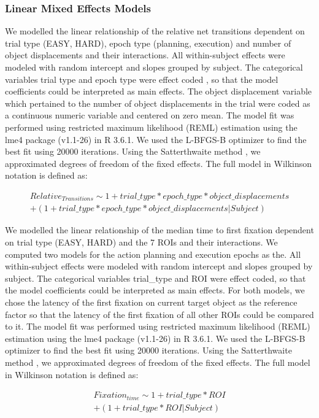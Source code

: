 \subsubsection{Linear Mixed Effects Models} \label{sec:lmm}
We modelled the linear relationship of the relative net transitions dependent on trial type (EASY, HARD), epoch type (planning, execution) and number of object displacements and their interactions. All within-subject effects were modeled with random intercept and slopes grouped by subject. The categorical variables trial type and epoch type were effect coded \citep{Schad2018-av}, so that the model coefficients could be interpreted as main effects. The object displacement variable which pertained to the number of object displacements in the trial were coded as a continuous numeric variable and centered on zero mean. The model fit was performed using restricted maximum likelihood (REML) estimation \citep{Corbeil1976-qq} using the lme4 package (v1.1-26) in R 3.6.1. We used the L-BFGS-B optimizer to find the best fit using 20000 iterations. Using the Satterthwaite method \citep{Luke2017-pz}, we approximated degrees of freedom of the fixed effects. The full model in Wilkinson notation \citep{Wilkinson1973-ex}  is defined as:

\begin{gather}\label{eq:lmm_formula1}
     Relative_{Transitions} \sim 1 + trial\_type * epoch\_type * object\_displacements \\
     + (1 + trial\_type * epoch\_type * object\_displacements | Subject ) 
\end{gather} 


We modelled the linear relationship of the median time to first fixation dependent on trial type (EASY, HARD) and the 7 ROIs and their interactions. We computed two models for the action planning and execution epochs as the. All within-subject effects were modeled with random intercept and slopes grouped by subject. The categorical variables trial\_type and ROI were effect coded, so that the model coefficients could be interpreted as main effects. For both models, we chose the latency of the first fixation on current target object as the reference factor so that the latency of the first fixation of all other ROIs could be compared to it. The model fit was performed using restricted maximum likelihood (REML) estimation \citep{Corbeil1976-qq} using the lme4 package (v1.1-26) in R 3.6.1. We used the L-BFGS-B optimizer to find the best fit using 20000 iterations. Using the Satterthwaite method \citep{Luke2017-pz}, we approximated degrees of freedom of the fixed effects. The full model in Wilkinson notation \citep{Wilkinson1973-ex}  is defined as:

\begin{gather}\label{eq:lmm_formula2}
     Fixation_{time} \sim 1 + trial\_type * ROI \\
     + (1 + trial\_type * ROI | Subject ) 
\end{gather} 



